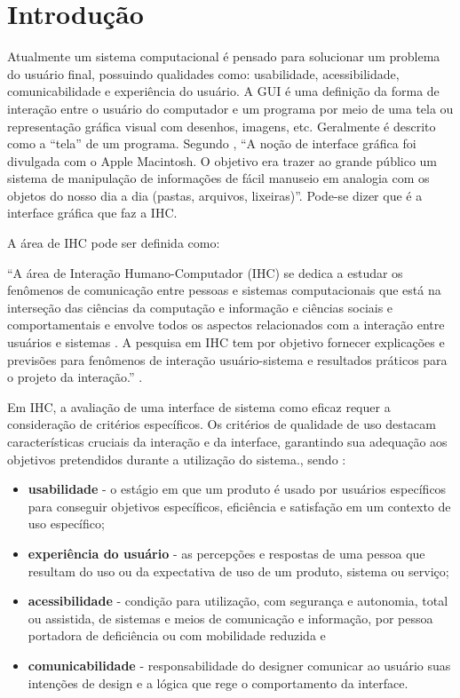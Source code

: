 \chapter[Introdução]{Introdução}

Atualmente um sistema computacional é pensado para solucionar um problema do usuário final, possuindo qualidades como: usabilidade, acessibilidade, comunicabilidade e experiência do usuário. A \ac{GUI} é uma definição da forma de interação entre o usuário do computador e um programa por meio de uma tela ou representação gráfica visual com desenhos, imagens, etc. Geralmente é descrito como a “tela” de um programa. Segundo , “A noção de interface gráfica foi divulgada com o Apple Macintosh. O objetivo era trazer ao grande público um sistema de manipulação de informações de fácil manuseio em analogia com os objetos do nosso dia a dia (pastas, arquivos, lixeiras)”.
Pode-se dizer que é a interface gráfica que faz a \ac{IHC}.

A área de \ac{IHC} pode ser definida como:
 \begin{citacao}
“A área de Interação Humano-Computador (\acs{IHC}) se dedica a estudar os fenômenos de comunicação entre pessoas e sistemas computacionais que está na interseção das ciências da computação e informação e ciências sociais e comportamentais e envolve todos os aspectos relacionados com a interação entre usuários e sistemas . A pesquisa em \acs{IHC} tem por objetivo fornecer explicações e previsões para fenômenos de interação usuário-sistema e resultados práticos para o projeto da interação.” \cite{sbcihc}.
\end{citacao}


Em \acs{IHC}, a avaliação de uma interface de sistema como eficaz requer a consideração de critérios específicos. Os critérios de qualidade de uso destacam características cruciais da interação e da interface, garantindo sua adequação aos objetivos pretendidos durante a utilização do sistema., sendo \cite{barbosa2010interaccao}:
\begin{itemize}
    \item \textbf{usabilidade} - o estágio em que um produto é usado por usuários específicos para conseguir objetivos específicos, eficiência e satisfação em um contexto de uso específico;
    \item \textbf{experiência do usuário} - as percepções e respostas de uma pessoa que resultam do uso ou da expectativa de uso de um produto, sistema ou serviço;
    \item \textbf{acessibilidade} - condição para utilização, com segurança e autonomia, total ou assistida, de sistemas e meios de comunicação e informação, por pessoa portadora de deficiência ou com mobilidade reduzida e
    \item \textbf{comunicabilidade} - responsabilidade do designer comunicar ao usuário suas intenções de design e a lógica que rege o comportamento da interface.
\end{itemize}

